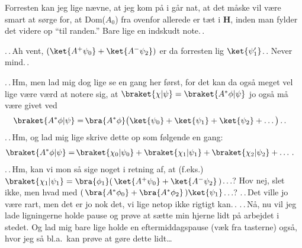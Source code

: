 \documentclass{report}
\begin{document}
Forresten kan jeg lige nævne, at jeg kom på i går nat, at det måske vil være smart at sørge for, at Dom($A_0$) fra ovenfor allerede er tæt i \textbf{H}, inden man fylder det videre op ``til randen.'' Bare lige en indskudt note.\,. 

.\,.\,Ah vent, $(\ket{A^+ \psi_0} + \ket{A^- \psi_2})$ er da forresten lig $\ket{\psi_1'}$.\,. Never mind.\,.

.\,.\,Hm, men lad mig dog lige se en gang her først, for det kan da også meget vel lige være værd at notere sig, at $\braket{\chi | \psi}=\braket{A^* \phi | \psi}$ jo også må være givet ved
\begin{align}
\begin{aligned}
	\braket{A^* \phi | \psi} =&\, 
		\bra{A^* \phi} \big(
			\ket{\psi_0} +
			\ket{\psi_1} +
			\ket{\psi_2} +
			\ldots
		\big)\,.\,.
\end{aligned}
\end{align}
.\,.\,Hm, og lad mig lige skrive dette op som følgende en gang:
\begin{align}
\begin{aligned}
	\braket{A^* \phi | \psi} =&\, 
		\braket{\chi_0 | \psi_0} +
		\braket{\chi_1 | \psi_1} +
		\braket{\chi_2 | \psi_2} +
		\ldots\,.
\end{aligned}
\end{align}
.\,.\,Hm, kan vi mon så sige noget i retning af, at (f.eks.) $\braket{\chi_1 | \psi_1} = \bra{\phi_1} (\,\ket{A^+ \psi_0} + \ket{A^- \psi_2}\,)$.\,.\,.? Hov nej, slet ikke, men hvad med $(\,\bra{A^*\phi_0} + \bra{A^* \phi_2}\,) \ket{\psi_1}$.\,.\,.? .\,.\,Det ville jo være rart, men det er jo nok det, vi lige netop ikke rigtigt kan.\,. .\,.\,Nå, nu vil jeg lade ligningerne holde pause og prøve at sætte min hjerne lidt på arbejdet i stedet. Og lad mig bare lige holde en eftermiddagspause (væk fra tasterne) også, hvor jeg så bl.a.\ kan prøve at gøre dette lidt\ldots  
\end{document}
